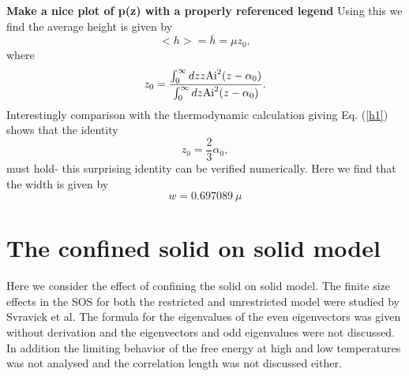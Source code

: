 {\bf Make a nice plot of p(z) with a properly referenced legend}
Using this we find the average height is given by
\begin{equation}
    < h> = \overline h= \mu z_0,
\end{equation}
where 
\begin{equation}
    z_0 = \frac{\int_0^\infty dz z {\rm Ai}^2(z-\alpha_0)}{\int_0^\infty dz {\rm Ai}^2(z-\alpha_0)}.
\end{equation}
Interestingly comparison with the thermodynamic calculation giving Eq. (\ref{h1}) shows that the identity
\begin{equation}
    z_0 = \frac{2}{3}\alpha_0,
\end{equation}
must hold- this surprising identity can be verified numerically. Here we find that the width is given by
\begin{equation}
    w= 0.697089 \ \mu
\end{equation}


\section{The confined solid on solid model}
Here we consider the effect of confining the solid on solid model. The finite size effects in the SOS for both the restricted and unrestricted model were studied by Svravick et al. The formula for the eigenvalues of the even eigenvectors was given without derivation and the eigenvectors and odd eigenvalues were not discussed. In addition the limiting behavior of the free energy at high and low temperatures was not analysed and the correlation length was not discussed either. 

